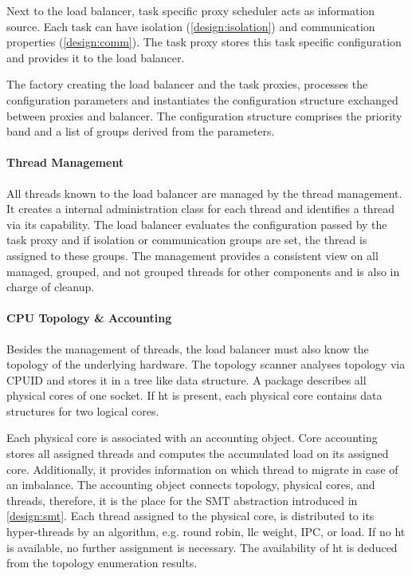 Next to the load balancer, task specific proxy scheduler acts as information
source.
Each task can have isolation (\ref{design:isolation}) and communication
properties (\ref{design:comm}).
The task proxy stores this task specific configuration and provides it to the
load balancer.

The factory creating the load balancer and the task proxies, processes the
configuration parameters and instantiates the configuration structure exchanged
between proxies and balancer.
The configuration structure comprises the priority band and a list of
groups derived from the parameters.


\paragraph{Thread Management}
All threads known to the load balancer are managed by the thread management.
It creates a internal administration class for each thread and identifies a
thread via its capability.
The load balancer evaluates the configuration passed by the task proxy and
if isolation or communication groups are set, the thread is assigned to these
groups.
The management provides a consistent view on all managed, grouped, and not
grouped threads for other components and is also in charge of cleanup.


\paragraph{CPU Topology \& Accounting}
Besides the management of threads, the load balancer must also know the
topology of the underlying hardware.
The topology scanner analyses topology via CPUID and stores it in a tree like
data structure.
A package describes all physical cores of one socket.
If \gls{ht} is present, each physical core contains data structures for
two logical cores.

Each physical core is associated with an accounting object.
Core accounting stores all assigned threads and computes the accumulated
load on its assigned core.
Additionally, it provides information on which thread to migrate in case of an
imbalance.
The accounting object connects topology, physical cores, and threads, therefore,
it is the place for the SMT abstraction introduced in \ref{design:smt}.
Each thread assigned to the physical core, is distributed to its hyper-threads
by an algorithm, e.g. round robin, \gls{llc} weight, IPC, or load.
If no \gls{ht} is available, no further assignment is necessary.
The availability of \gls{ht} is deduced from the topology enumeration results.


